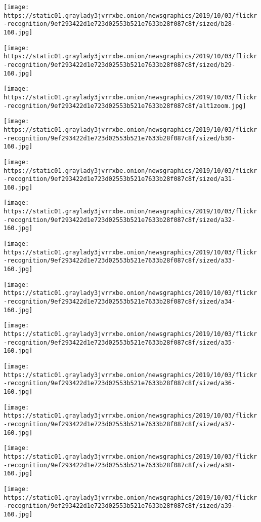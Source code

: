 \texttt{[image: https://static01.graylady3jvrrxbe.onion/newsgraphics/2019/10/03/flickr-recognition/9ef293422d1e723d02553b521e7633b28f087c8f/sized/b28-160.jpg]}

\texttt{[image: https://static01.graylady3jvrrxbe.onion/newsgraphics/2019/10/03/flickr-recognition/9ef293422d1e723d02553b521e7633b28f087c8f/sized/b29-160.jpg]}

\texttt{[image: https://static01.graylady3jvrrxbe.onion/newsgraphics/2019/10/03/flickr-recognition/9ef293422d1e723d02553b521e7633b28f087c8f/alt1zoom.jpg]}

\texttt{[image: https://static01.graylady3jvrrxbe.onion/newsgraphics/2019/10/03/flickr-recognition/9ef293422d1e723d02553b521e7633b28f087c8f/sized/b30-160.jpg]}

\texttt{[image: https://static01.graylady3jvrrxbe.onion/newsgraphics/2019/10/03/flickr-recognition/9ef293422d1e723d02553b521e7633b28f087c8f/sized/a31-160.jpg]}

\texttt{[image: https://static01.graylady3jvrrxbe.onion/newsgraphics/2019/10/03/flickr-recognition/9ef293422d1e723d02553b521e7633b28f087c8f/sized/a32-160.jpg]}

\texttt{[image: https://static01.graylady3jvrrxbe.onion/newsgraphics/2019/10/03/flickr-recognition/9ef293422d1e723d02553b521e7633b28f087c8f/sized/a33-160.jpg]}

\texttt{[image: https://static01.graylady3jvrrxbe.onion/newsgraphics/2019/10/03/flickr-recognition/9ef293422d1e723d02553b521e7633b28f087c8f/sized/a34-160.jpg]}

\texttt{[image: https://static01.graylady3jvrrxbe.onion/newsgraphics/2019/10/03/flickr-recognition/9ef293422d1e723d02553b521e7633b28f087c8f/sized/a35-160.jpg]}

\texttt{[image: https://static01.graylady3jvrrxbe.onion/newsgraphics/2019/10/03/flickr-recognition/9ef293422d1e723d02553b521e7633b28f087c8f/sized/a36-160.jpg]}

\texttt{[image: https://static01.graylady3jvrrxbe.onion/newsgraphics/2019/10/03/flickr-recognition/9ef293422d1e723d02553b521e7633b28f087c8f/sized/a37-160.jpg]}

\texttt{[image: https://static01.graylady3jvrrxbe.onion/newsgraphics/2019/10/03/flickr-recognition/9ef293422d1e723d02553b521e7633b28f087c8f/sized/a38-160.jpg]}

\texttt{[image: https://static01.graylady3jvrrxbe.onion/newsgraphics/2019/10/03/flickr-recognition/9ef293422d1e723d02553b521e7633b28f087c8f/sized/a39-160.jpg]}

